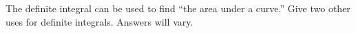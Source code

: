 {The definite integral can be used to find ``the area under a curve.'' Give two other uses for definite integrals.
}
{Answers will vary.
}

